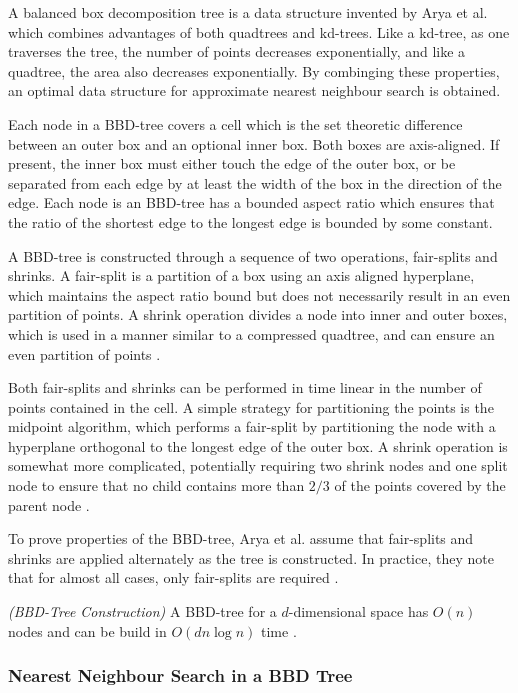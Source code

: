 \documentclass[mcs]{scsthesis}
\begin{document}
A balanced box decomposition tree is a data structure invented by Arya et al.
\cite{optimalann} which combines advantages of both quadtrees and kd-trees.
Like a kd-tree, as one traverses the tree, the number of points decreases
exponentially, and like a quadtree, the area also decreases exponentially. By
combinging these properties, an optimal data structure for approximate nearest
neighbour search is obtained.

Each node in a BBD-tree covers a cell which is the set theoretic difference
between an outer box and an optional inner box. Both boxes are axis-aligned.
If present, the inner box must either touch the edge of the outer box, or be
separated from each edge by at least the width of the box in the direction of
the edge. Each node is an BBD-tree has a bounded aspect ratio which ensures
that the ratio of the shortest edge to the longest edge is bounded by some
constant.

A BBD-tree is constructed through a sequence of two operations, fair-splits
and shrinks. A fair-split is a partition of a box using an axis aligned
hyperplane, which maintains the aspect ratio bound but does not necessarily
result in an even partition of points. A shrink operation divides a node into
inner and outer boxes, which is used in a manner similar to a compressed
quadtree, and can ensure an even partition of points \cite{optimalann}.

Both fair-splits and shrinks can be performed in time linear in the number of
points contained in the cell. A simple strategy for partitioning the points is
the midpoint algorithm, which performs a fair-split by partitioning the node
with a hyperplane orthogonal to the longest edge of the outer box. A shrink
operation is somewhat more complicated, potentially requiring two shrink nodes
and one split node to ensure that no child contains more than \(2/3\) of the
points covered by the parent node \cite{optimalann}.

To prove properties of the BBD-tree, Arya et al. assume that fair-splits and
shrinks are applied alternately as the tree is constructed. In practice, they
note that for almost all cases, only fair-splits are required \cite{optimalann}. 

\begin{thm} \emph{(BBD-Tree Construction)} 
A BBD-tree for a \(d\)-dimensional space has \(O(n)\) nodes and can be build in
\(O(d n \log n)\) time \cite{optimalann}.
\end{thm}

\subsubsection{Nearest Neighbour Search in a BBD Tree}
\end{document}
